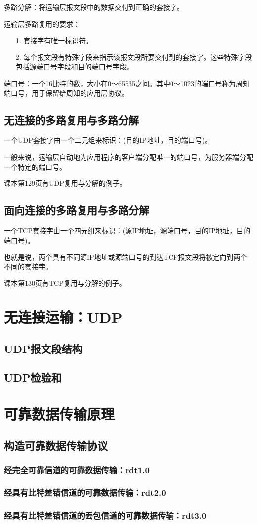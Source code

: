 \documentclass[a4paper,left=2.5cm,right=2.5cm,11pt]{article}
\begin{document}
	多路分解：将运输层报文段中的数据交付到正确的套接字。\par

	运输层多路复用的要求：
	\begin{itemize}
		\item[1.] 套接字有唯一标识符。
		\item[2.] 每个报文段有特殊字段来指示该报文段所要交付到的套接字。这些特殊字段包括源端口号字段和目的端口号字段。
	\end{itemize}

	端口号：一个16比特的数，大小在0～65535之间。其中0～1023的端口号称为周知端口号，用于保留给周知的应用层协议。

\subsection{无连接的多路复用与多路分解}
	一个UDP套接字由一个二元组来标识：(目的IP地址，目的端口号)。\par

	一般来说，运输层自动地为应用程序的客户端分配唯一的端口号，为服务器端分配一个特定的端口号。\par

	课本第129页有UDP复用与分解的例子。

\subsection{面向连接的多路复用与多路分解}
	一个TCP套接字由一个四元组来标识：(源IP地址，源端口号，目的IP地址，目的端口号)。\par

	也就是说，两个具有不同源IP地址或源端口号的到达TCP报文段将被定向到两个不同的套接字。\par

	课本第130页有TCP复用与分解的例子。

\section{无连接运输：UDP}
\subsection{UDP报文段结构}
\subsection{UDP检验和}

\section{可靠数据传输原理}
\subsection{构造可靠数据传输协议}
\subsubsection{经完全可靠信道的可靠数据传输：rdt1.0}
\subsubsection{经具有比特差错信道的可靠数据传输：rdt2.0}
\subsubsection{经具有比特差错信道的丢包信道的可靠数据传输：rdt3.0}
\end{document}
